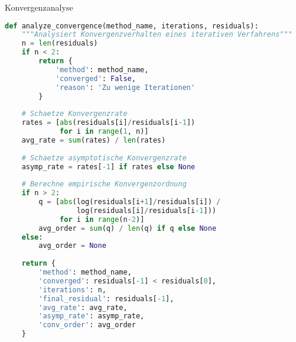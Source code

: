 \begin{examplecode}{Konvergenzanalyse}
\begin{lstlisting}[language=Python, style=basesmol]
def analyze_convergence(method_name, iterations, residuals):
    """Analysiert Konvergenzverhalten eines iterativen Verfahrens"""
    n = len(residuals)
    if n < 2:
        return {
            'method': method_name,
            'converged': False,
            'reason': 'Zu wenige Iterationen'
        }
        
    # Schaetze Konvergenzrate
    rates = [abs(residuals[i]/residuals[i-1]) 
             for i in range(1, n)]
    avg_rate = sum(rates) / len(rates)
    
    # Schaetze asymptotische Konvergenzrate
    asymp_rate = rates[-1] if rates else None
    
    # Berechne empirische Konvergenzordnung
    if n > 2:
        q = [abs(log(residuals[i+1]/residuals[i]) / 
                 log(residuals[i]/residuals[i-1])) 
             for i in range(n-2)]
        avg_order = sum(q) / len(q) if q else None
    else:
        avg_order = None
        
    return {
        'method': method_name,
        'converged': residuals[-1] < residuals[0],
        'iterations': n,
        'final_residual': residuals[-1],
        'avg_rate': avg_rate,
        'asymp_rate': asymp_rate,
        'conv_order': avg_order
    }
\end{lstlisting}
\end{examplecode}

